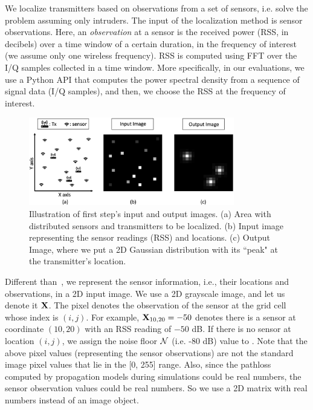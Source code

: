 We localize transmitters based on observations from a set of sensors, i.e. solve the \mtl problem assuming only intruders.
The input of the localization method is sensor observations. 
Here, an {\em observation} at a sensor is the received power (RSS, in decibels) over a time window of a certain duration, in the frequency of interest (we assume only one wireless frequency). 
RSS is computed using FFT over the I/Q samples collected in a time window. More specifically, in our evaluations, we use a Python API \cite{psd} that computes the power spectral density from a sequence of signal data (I/Q samples), and then, we choose the RSS at the frequency of interest.
\begin{figure}[t]
    \centering
    \includegraphics[width=0.8\textwidth]{chapters/wowmom-pmc/figures/input-output.png}
    \caption{Illustration of \our first step's input and output images. (a) Area with distributed sensors and transmitters to be localized. (b) Input image representing the sensor readings (RSS) and locations. (c) Output Image, where we put a 2D Gaussian distribution with its ``peak" at the transmitter's location.}
    \label{fig:input}
\end{figure}
Different than~\cite{mobicom17-splot,ipsn20-mtl}, we represent the sensor information, i.e.,
their locations and observations, in a 2D input image.
We use a 2D grayscale image, and let us denote it $\mathbf{X}$. The pixel \mxij denotes the observation of the sensor at the grid cell whose index is $(i, j)$. For example, $\mathbf{X}_{10, 20}=-50$ denotes there is a sensor at coordinate $(10, 20)$ with an RSS reading of $-50$ dB. 
If there is no sensor at location $(i, j)$, we assign the noise floor $\cal{N}$ (i.e. -80 dB) value to \mxij.
Note that the above pixel values (representing the sensor observations) are not the standard
image pixel values that lie in the [0, 255] range.
Also, since the pathloss computed by propagation models during simulations could be real numbers, the sensor observation values could be real numbers. 
So we use a 2D matrix with real numbers instead of an image object.

